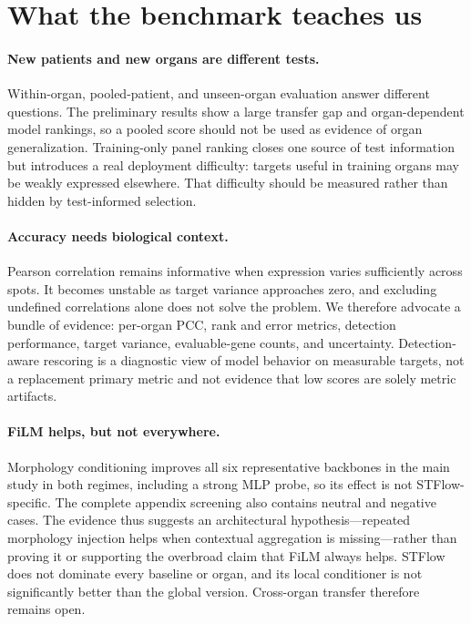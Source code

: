 \section{What the benchmark teaches us}
\label{sec:discussion}
\paragraph{New patients and new organs are different tests.}
Within-organ, pooled-patient, and unseen-organ evaluation answer different questions. The preliminary
results show a large transfer gap and organ-dependent model rankings, so a pooled score should not be
used as evidence of organ generalization. Training-only panel ranking closes one source of test
information but introduces a real deployment difficulty: targets useful in training organs may be
weakly expressed elsewhere. That difficulty should be measured rather than hidden by test-informed
selection.

\paragraph{Accuracy needs biological context.}
Pearson correlation remains informative when expression varies sufficiently across spots. It becomes
unstable as target variance approaches zero, and excluding undefined correlations alone does not solve
the problem. We therefore advocate a bundle of evidence: per-organ PCC, rank and error metrics,
detection performance, target variance, evaluable-gene counts, and uncertainty. Detection-aware
rescoring is a diagnostic view of model behavior on measurable targets, not a replacement primary
metric and not evidence that low scores are solely metric artifacts.

\paragraph{FiLM helps, but not everywhere.}
Morphology conditioning improves all six representative backbones in the main study in both regimes,
including a strong MLP probe, so its effect is not STFlow-specific. The complete appendix screening
also contains neutral and negative cases. The evidence thus
suggests an architectural hypothesis---repeated morphology injection helps when contextual aggregation
is missing---rather than proving it or supporting the overbroad claim that FiLM always helps. STFlow does not dominate every
baseline or organ, and its local conditioner is not significantly better than the global version.
Cross-organ transfer therefore remains open.

